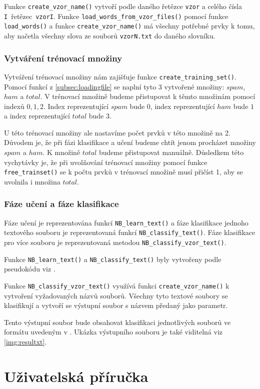 \documentclass[12pt]{report}
\begin{document}
Funkce \verb|create_vzor_name()| vytvoří podle daného řetězce \verb|vzor| a celého čísla \verb|I|~řetězec~\verb|vzorI|. 
Funkce \verb|load_words_from_vzor_files()| pomocí funkce \verb|load_words()| a funkce \verb|create_vzor_name()| má všechny potřebné prvky k tomu, aby načetla všechny slova ze souborů \verb|vzorN.txt| do daného slovníku.

\subsection{Vytváření trénovací množiny}
\label{subsec:trainset}
Vytváření trénovací množiny nám zajišťuje funkce \verb|create_training_set()|.
Pomocí funkcí z \ref{subsec:loadingfile} se naplní tyto 3 vytvořené množiny: $spam$, $ham$ a $total$. V trénovací množině budeme přistupovat k těmto množinám pomocí indexů $0,1,2$. Index reprezentující $spam$ bude $0$, index reprezentující $ham$ bude $1$ a index reprezentující $total$ bude $3$.

U této trénovací množiny ale nastavíme počet prvků v této množině na 2. Důvodem je, že při fázi klasifikace a učení budeme chtít jenom procházet množiny $spam$ a $ham$. K množině $total$ budeme přistupovat manuálně. Důsledkem této vychytávky je, že při uvolňování trénovací množiny pomocí funkce \verb|free_trainset()| se k počtu prvků v trénovací množině musí přičíst 1, aby se uvolnila i množina $total$.

\subsection{Fáze učení a fáze klasifikace}
Fáze učení je reprezentována funkcí \verb|NB_learn_text()| a fáze klasifikace jednoho textového souboru je reprezentovaná funkcí \verb|NB_classify_text()|. Fáze klasifikace pro více souboru je reprezentovaná metodou \verb|NB_classify_vzor_text()|.

Funkce \verb|NB_learn_text()| a \verb|NB_classify_text()| byly vytvořeny podle pseudokódu viz \cite{zadani}.

Funkce \verb|NB_classify_vzor_text()| využívá funkci \verb|create_vzor_name()| k vytvoření vyžadovaných názvů souborů. Všechny tyto textové soubory se klasifikují a vytvoří se výstupní soubor s názvem předaný jako parametr. 

Tento výstupní soubor bude obsahovat klasifikaci jednotlivých souborů ve formátu uvedeným v \cite{zadani}. Ukázka výstupního souboru je také viditelná viz \ref{img:resultxt}.


\chapter{Uživatelská příručka}
\end{document}
